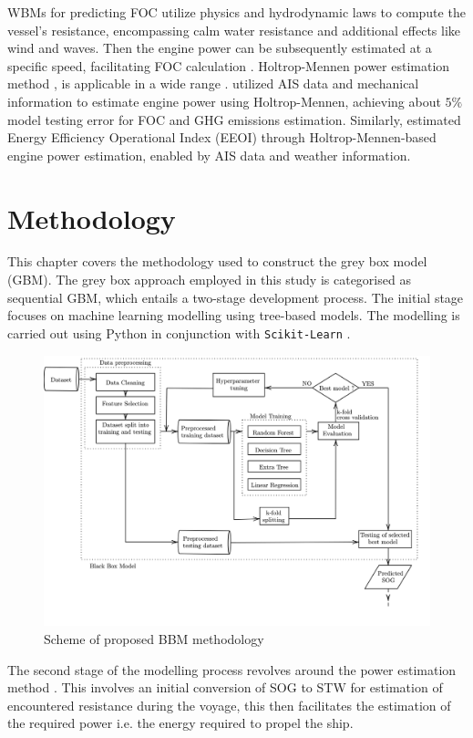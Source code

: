 \documentclass[]{interact}
\theoremstyle{plain}%
\theoremstyle{definition}
\theoremstyle{remark}
\begin{document}
WBMs for predicting FOC utilize physics and hydrodynamic laws to compute the vessel's resistance, encompassing calm water resistance and additional effects like wind and waves. Then the engine power can be subsequently estimated at a specific speed, facilitating FOC calculation \citep{haranen2016white}. Holtrop-Mennen power estimation method \citet{Holtrop.1984}, is applicable in a wide range \citep{Rakke.2016,Kim.2020b}. \citet{Rakke.2016} utilized AIS data and mechanical information to estimate engine power using Holtrop-Mennen, achieving about $5\%$ model testing error for FOC and GHG emissions estimation. Similarly, \citet{Kim.2020b} estimated Energy Efficiency Operational Index (EEOI) through Holtrop-Mennen-based engine power estimation, enabled by AIS data and weather information.

\section{Methodology}\label{sec:big_methodology}

This chapter covers the methodology used to construct the grey box model (GBM). The grey box approach employed in this study is categorised as sequential GBM, which entails a two-stage development process. The initial stage focuses on machine learning modelling using tree-based models. The modelling is carried out using Python in conjunction with \texttt{Scikit-Learn} \citep{FabianPedregosa.2011}. 
\begin{figure}
  \centering
      \includegraphics[width=.75\textwidth]{00_figures/flowmethod_BBM_alt.png}
      \caption{Scheme of proposed BBM methodology}
      \label{fig:flowchart_BBM}
\end{figure}

The second stage of the modelling process revolves around the power estimation method \citep{Holtrop.1984}. This involves an initial conversion of SOG to STW for estimation of encountered resistance during the voyage, this then facilitates the estimation of the required power i.e. the energy required to propel the ship.
\end{document}
